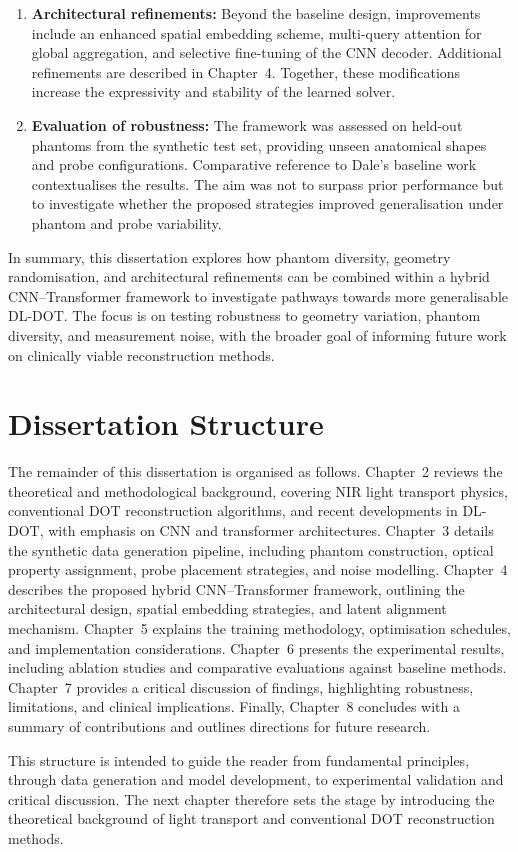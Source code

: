 \begin{enumerate}
    \item \textbf{Architectural refinements:} Beyond the baseline design, improvements include an enhanced spatial embedding scheme, multi-query attention for global aggregation, and selective fine-tuning of the CNN decoder. Additional refinements are described in Chapter~4. Together, these modifications increase the expressivity and stability of the learned solver.
    
    \item \textbf{Evaluation of robustness:} The framework was assessed on held-out phantoms from the synthetic test set, providing unseen anatomical shapes and probe configurations. Comparative reference to Dale’s baseline work contextualises the results. The aim was not to surpass prior performance but to investigate whether the proposed strategies improved generalisation under phantom and probe variability.
\end{enumerate}

In summary, this dissertation explores how phantom diversity, geometry randomisation, and architectural refinements can be combined within a hybrid CNN–Transformer framework to investigate pathways towards more generalisable DL-DOT. The focus is on testing robustness to geometry variation, phantom diversity, and measurement noise, with the broader goal of informing future work on clinically viable reconstruction methods.


\section{Dissertation Structure}
The remainder of this dissertation is organised as follows. Chapter~2 reviews the theoretical and methodological background, covering NIR light transport physics, conventional DOT reconstruction algorithms, and recent developments in DL-DOT, with emphasis on CNN and transformer architectures. Chapter~3 details the synthetic data generation pipeline, including phantom construction, optical property assignment, probe placement strategies, and noise modelling. Chapter~4 describes the proposed hybrid CNN–Transformer framework, outlining the architectural design, spatial embedding strategies, and latent alignment mechanism. Chapter~5 explains the training methodology, optimisation schedules, and implementation considerations. Chapter~6 presents the experimental results, including ablation studies and comparative evaluations against baseline methods. Chapter~7 provides a critical discussion of findings, highlighting robustness, limitations, and clinical implications. Finally, Chapter~8 concludes with a summary of contributions and outlines directions for future research.

This structure is intended to guide the reader from fundamental principles, through data generation and model development, to experimental validation and critical discussion. The next chapter therefore sets the stage by introducing the theoretical background of light transport and conventional DOT reconstruction methods.